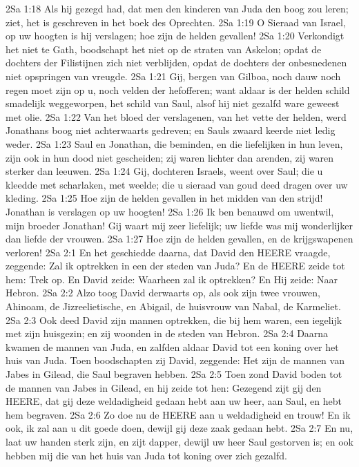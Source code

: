 2Sa 1:18  Als hij gezegd had, dat men den kinderen van Juda den boog zou leren; ziet, het is geschreven in het boek des Oprechten.
2Sa 1:19  O Sieraad van Israel, op uw hoogten is hij verslagen; hoe zijn de helden gevallen!
2Sa 1:20  Verkondigt het niet te Gath, boodschapt het niet op de straten van Askelon; opdat de dochters der Filistijnen zich niet verblijden, opdat de dochters der onbesnedenen niet opspringen van vreugde.
2Sa 1:21  Gij, bergen van Gilboa, noch dauw noch regen moet zijn op u, noch velden der hefofferen; want aldaar is der helden schild smadelijk weggeworpen, het schild van Saul, alsof hij niet gezalfd ware geweest met olie.
2Sa 1:22  Van het bloed der verslagenen, van het vette der helden, werd Jonathans boog niet achterwaarts gedreven; en Sauls zwaard keerde niet ledig weder.
2Sa 1:23  Saul en Jonathan, die beminden, en die liefelijken in hun leven, zijn ook in hun dood niet gescheiden; zij waren lichter dan arenden, zij waren sterker dan leeuwen.
2Sa 1:24  Gij, dochteren Israels, weent over Saul; die u kleedde met scharlaken, met weelde; die u sieraad van goud deed dragen over uw kleding.
2Sa 1:25  Hoe zijn de helden gevallen in het midden van den strijd! Jonathan is verslagen op uw hoogten!
2Sa 1:26  Ik ben benauwd om uwentwil, mijn broeder Jonathan! Gij waart mij zeer liefelijk; uw liefde was mij wonderlijker dan liefde der vrouwen.
2Sa 1:27  Hoe zijn de helden gevallen, en de krijgswapenen verloren!
2Sa 2:1  En het geschiedde daarna, dat David den HEERE vraagde, zeggende: Zal ik optrekken in een der steden van Juda? En de HEERE zeide tot hem: Trek op. En David zeide: Waarheen zal ik optrekken? En Hij zeide: Naar Hebron.
2Sa 2:2  Alzo toog David derwaarts op, als ook zijn twee vrouwen, Ahinoam, de Jizreelietische, en Abigail, de huisvrouw van Nabal, de Karmeliet.
2Sa 2:3  Ook deed David zijn mannen optrekken, die bij hem waren, een iegelijk met zijn huisgezin; en zij woonden in de steden van Hebron.
2Sa 2:4  Daarna kwamen de mannen van Juda, en zalfden aldaar David tot een koning over het huis van Juda. Toen boodschapten zij David, zeggende: Het zijn de mannen van Jabes in Gilead, die Saul begraven hebben.
2Sa 2:5  Toen zond David boden tot de mannen van Jabes in Gilead, en hij zeide tot hen: Gezegend zijt gij den HEERE, dat gij deze weldadigheid gedaan hebt aan uw heer, aan Saul, en hebt hem begraven.
2Sa 2:6  Zo doe nu de HEERE aan u weldadigheid en trouw! En ik ook, ik zal aan u dit goede doen, dewijl gij deze zaak gedaan hebt.
2Sa 2:7  En nu, laat uw handen sterk zijn, en zijt dapper, dewijl uw heer Saul gestorven is; en ook hebben mij die van het huis van Juda tot koning over zich gezalfd.
